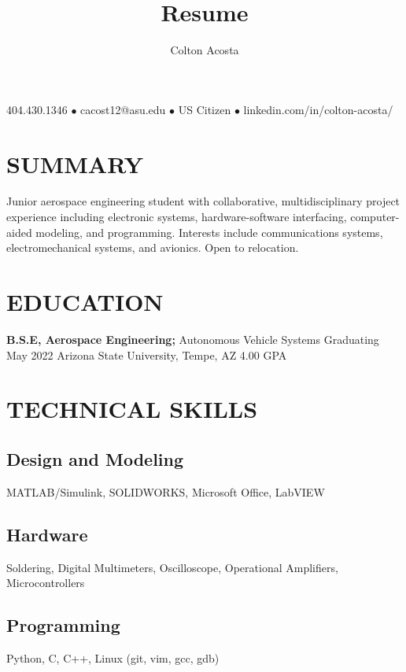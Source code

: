 \documentclass{article}
\makeatletter
\renewcommand{\maketitle}{
	\begin{center}
		{\huge\bfseries
			\theauthor}
			
		404.430.1346 $\bullet$ cacost12@asu.edu $\bullet$ US Citizen $\bullet$ linkedin.com/in/colton-acosta/
	\end{center}
}
\makeatother
\begin{document}
\title{Resume}
\author{Colton Acosta}
\maketitle
\section{SUMMARY}
Junior aerospace engineering student with collaborative, multidisciplinary project experience including electronic systems, hardware-software interfacing, computer-aided modeling, and programming. Interests include communications systems, electromechanical systems, and avionics. Open to relocation. 
\section{EDUCATION}
\textbf{B.S.E, Aerospace Engineering;} Autonomous Vehicle Systems
\hfill 
Graduating May 2022
\linebreak
Arizona State University, Tempe, AZ 
\hfill
4.00 GPA

\section{TECHNICAL SKILLS}
\subsection{Design and Modeling}
MATLAB/Simulink, SOLIDWORKS, Microsoft Office, LabVIEW
\subsection{Hardware}
Soldering, Digital Multimeters, Oscilloscope, Operational Amplifiers, Microcontrollers
\subsection{Programming} 
Python, C, C++, Linux (git, vim, gcc, gdb)
\end{document}
